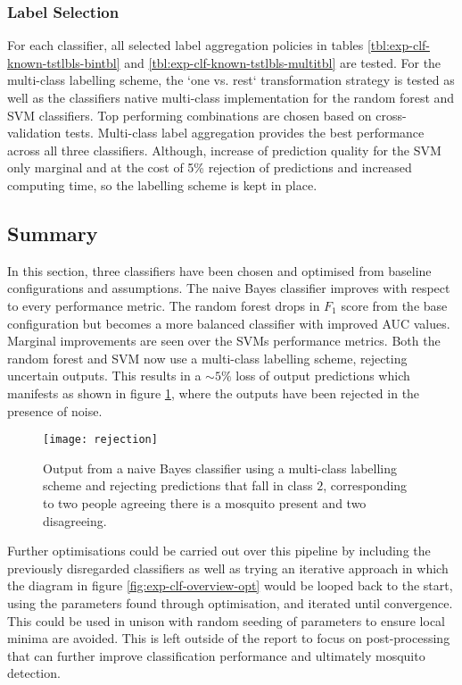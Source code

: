         \subsubsection{Label Selection}
        \label{subsubsec:exp-clf-opt-label}
            For each classifier, all selected label aggregation policies in tables \ref{tbl:exp-clf-known-tstlbls-bintbl} and \ref{tbl:exp-clf-known-tstlbls-multitbl} are tested. For the multi-class labelling scheme, the `one vs. rest` transformation strategy is tested as well as the classifiers native multi-class implementation for the random forest and SVM classifiers. Top performing combinations are chosen based on cross-validation tests. Multi-class label aggregation provides the best performance across all three classifiers. Although, increase of prediction quality for the SVM only marginal and at the cost of 5\% rejection of predictions and increased computing time, so the  labelling scheme is kept in place.

    \subsection{Summary}
    \label{subsec:exp-clf-summary}
        In this section, three classifiers have been chosen and optimised from baseline configurations and assumptions. The naive Bayes classifier improves with respect to every performance metric. The random forest drops in $F_{1}$ score from the base configuration but becomes a more balanced classifier with improved AUC values. Marginal improvements are seen over the SVMs performance metrics. Both the random forest and SVM now use a multi-class labelling scheme, rejecting uncertain outputs. This results in a $\sim5\%$ loss of output predictions which manifests as shown in figure \ref{fig:exp-clf-summary-rej}, where the outputs have been rejected in the presence of noise.
        \begin{figure}[ht]
            \centering
            \texttt{[image: rejection]}
            \caption{Output from a naive Bayes classifier using a multi-class labelling scheme and rejecting predictions that fall in class $2$, corresponding to two people agreeing there is a mosquito present and two disagreeing.}
            \label{fig:exp-clf-summary-rej}
        \end{figure}
        Further optimisations could be carried out over this pipeline by including the previously disregarded classifiers as well as trying an iterative approach in which the diagram in figure \ref{fig:exp-clf-overview-opt} would be looped back to the start, using the parameters found through optimisation, and iterated until convergence. This could be used in unison with random seeding of parameters to ensure local minima are avoided. This is left outside of the report to focus on post-processing that can further improve classification performance and ultimately mosquito detection.